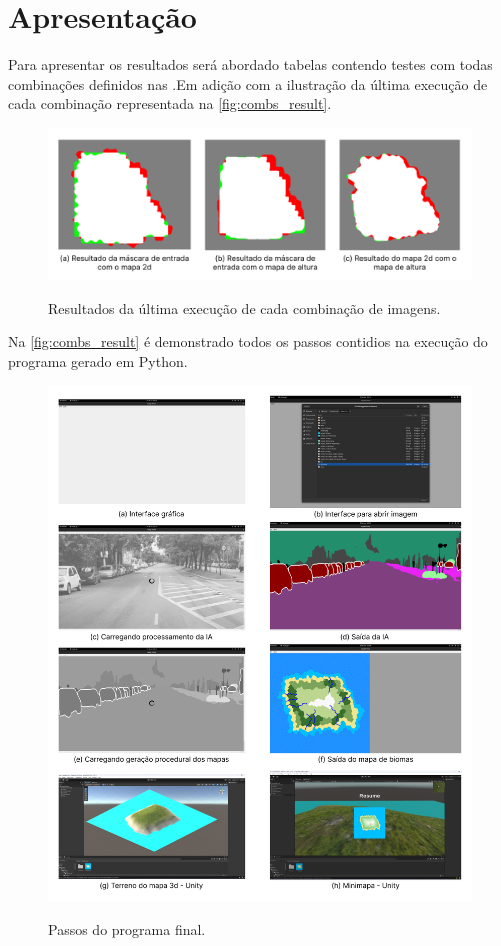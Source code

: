 \section{Apresentação}

Para apresentar os resultados será abordado tabelas contendo testes com todas combinações definidos nas .Em adição com a ilustração da última  execução de cada combinação representada na \cref{fig:combs_result}.



\begin{figure}[!ht]
	\centering
    \caption{Resultados da última execução de cada combinação de imagens.}
	\includegraphics[width=\textwidth]{figures/comb_results_final.png}
	\label{fig:result_final}
\end{figure}

Na \cref{fig:combs_result} é demonstrado todos os passos contidios na execução do programa gerado em Python.

\begin{figure}[!ht]
	\centering
    \caption{Passos do programa final.}
	\includegraphics[width=\textwidth]{figures/result_final.png}
	\label{fig:result_final}
\end{figure}
